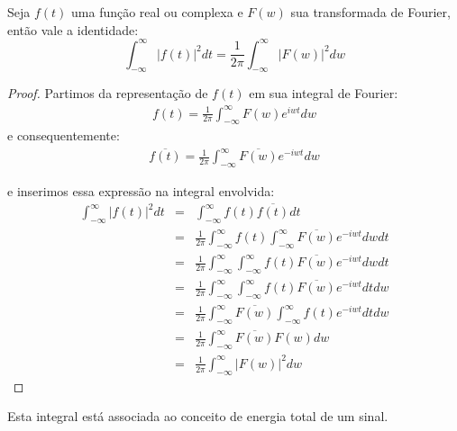 \begin{propr}\label{prop_teo_pars} Seja $f(t)$ uma função real ou complexa e $F(w)$ sua transformada de Fourier, então vale a identidade:
$$\int_{-\infty}^\infty |f(t)|^2dt = \frac{1}{2\pi} \int_{-\infty}^\infty |F(w)|^2dw$$
\end{propr}
\begin{proof}
Partimos da representação de $f(t)$ em sua integral de Fourier:
\begin{eqnarray*}
f(t)=\frac{1}{2\pi}\int_{-\infty}^\infty F(w)e^{iwt}dw
\end{eqnarray*}
e consequentemente:
\begin{eqnarray*}
\overline{f(t)}=\frac{1}{2\pi}\int_{-\infty}^\infty \overline{F(w)}e^{-iwt}dw
\end{eqnarray*}

e inserimos essa expressão na integral envolvida:
\begin{eqnarray*}
\int_{-\infty}^\infty |f(t)|^2dt &=&\int_{-\infty}^\infty f(t)\overline{f(t)} dt\\
&=&\frac{1}{2\pi}\int_{-\infty}^\infty f(t)\int_{-\infty}^\infty \overline{F(w)}e^{-iwt}dw dt\\
&=&\frac{1}{2\pi}\int_{-\infty}^\infty \int_{-\infty}^\infty f(t) \overline{F(w)}e^{-iwt}dw dt\\
&=&\frac{1}{2\pi}\int_{-\infty}^\infty \int_{-\infty}^\infty f(t) \overline{F(w)}e^{-iwt}dt dw\\
&=&\frac{1}{2\pi}\int_{-\infty}^\infty \overline{F(w)}\int_{-\infty}^\infty f(t) e^{-iwt}dt dw\\
&=&\frac{1}{2\pi}\int_{-\infty}^\infty \overline{F(w)}F(w) dw\\
&=&\frac{1}{2\pi}\int_{-\infty}^\infty |F(w)|^2 dw
\end{eqnarray*}
\end{proof}
\begin{obs}Esta integral está associada ao conceito de energia total de um sinal. 
\end{obs}

